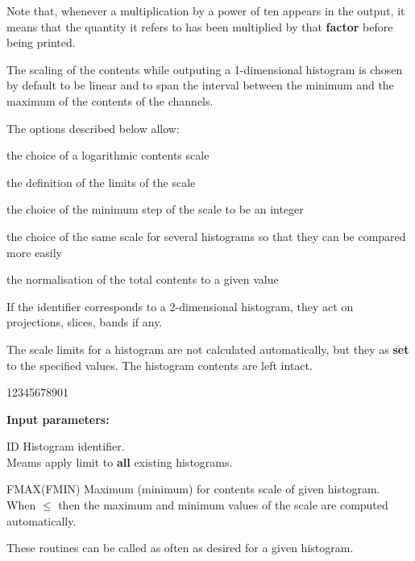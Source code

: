  
Note that, whenever a multiplication by
a power of ten appears in the output, it means
that the quantity it refers to has been
multiplied by that {\bf factor} before being printed.
 
The scaling of the contents while
outputing a 1-dimensional histogram is chosen by
default to be linear and to span the interval between the minimum
and the maximum of the contents of the channels.
 
The options described below allow:
 
\begin{UL}
\item the choice of a logarithmic contents scale
\item the definition of the limits of the scale
\item the choice of the minimum step of the scale to be an integer
\item the choice of the same scale for
several histograms so that they can be compared more easily
\item the normalisation of the total contents to a given value
\end{UL}
 
If the identifier corresponds to a 2-dimensional histogram,
they act on projections, slices, bands if any.
 
 
\Action
The scale limits for a histogram are not calculated
automatically, but they as {\bf set} to the specified values.
The histogram contents are left intact.
 
\begin{DLtt}{12345678901}
\item[{\rm\bf Input parameters:}]
\item[ID] Histogram identifier.\\
 Meams apply limit to {\bf all} existing histograms.
\item[FMAX(FMIN)] Maximum (minimum)
for contents scale of given histogram.\\
When \(\leq\) then the maximum and minimum values of the
scale are computed automatically.
\end{DLtt}
 
These routines can be called as often as desired for a given histogram.
 
 
